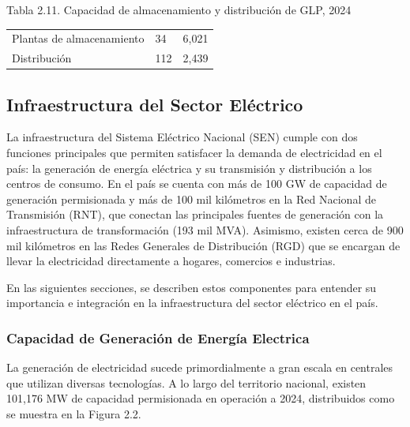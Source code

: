 \documentclass{sener2025}
\begin{document}
\begin{tabladoradoCorto}
  \caption{Tabla 2.11. Capacidad de almacenamiento y distribución de GLP, 2024}
  \label{tab:tabla_2_11__capacidad_de_almac}
  \begin{tabularx}{\textwidth}{Vvv}
    \toprule
      &  &  \\
    \midrule
    Plantas de almacenamiento & 34 & 6,021 \\
    Distribución & 112 & 2,439 \\
    \bottomrule
  \end{tabularx}
\end{tabladoradoCorto}
\vspace{-4pt}



\subsection{Infraestructura del Sector Eléctrico}

La infraestructura del Sistema Eléctrico Nacional (SEN) cumple con dos funciones principales que permiten satisfacer la demanda de electricidad en el país: la generación de energía eléctrica y su transmisión y distribución a los centros de consumo. En el país se cuenta con más de 100 GW de capacidad de generación permisionada y más de 100 mil kilómetros en la Red Nacional de Transmisión (RNT), que conectan las principales fuentes de generación con la infraestructura de transformación (193 mil MVA). Asimismo, existen cerca de 900 mil kilómetros en las Redes Generales de Distribución (RGD) que se encargan de llevar la electricidad directamente a hogares, comercios e industrias.

En las siguientes secciones, se describen estos componentes para entender su importancia e integración en la infraestructura del sector eléctrico en el país.


\subsubsection{Capacidad de Generación de Energía Electrica}

La generación de electricidad sucede primordialmente a gran escala en centrales que utilizan diversas tecnologías. A lo largo del territorio nacional, existen 101,176 MW de capacidad permisionada en operación a 2024, distribuidos como se muestra en la Figura 2.2.
\end{document}
